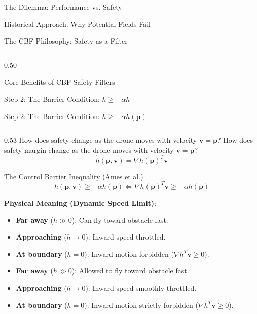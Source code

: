 \documentclass[aspectratio=169,10pt]{beamer}
\begin{document}
\begin{frame}{The Dilemma: Performance vs. Safety}
\begin{frame}{Historical Approach: Why Potential Fields Fail}
\begin{frame}{The CBF Philosophy: Safety as a Filter}
\begin{column}{0.50\textwidth}
\begin{exampleblock}{Core Benefits of CBF Safety Filters}
\begin{frame}{Step 2: The Barrier Condition: $\dot{h} \ge -\alpha h$}
\begin{frame}{Step 2: The Barrier Condition: $\dot{h} \ge -\alpha h(\mathbf{p})$}
  \begin{columns}[T]
    \begin{column}{0.53\textwidth}
      How does safety change as the drone moves with velocity $\mathbf{v} = \mathbf{\dot{p}}$?
      How does safety margin change as the drone moves with velocity $\mathbf{v} = \mathbf{\dot{p}}$?
      $$\dot{h}(\mathbf{p}, \mathbf{v}) = \nabla h(\mathbf{p})^T \mathbf{v}$$

      \begin{block}{The Control Barrier Inequality (Ames et al.)}
        $$\dot{h}(\mathbf{p}, \mathbf{v}) \ge -\alpha h(\mathbf{p}) \iff \nabla h(\mathbf{p})^T \mathbf{v} \ge -\alpha h(\mathbf{p})$$
      \end{block}

      \small
      \textbf{Physical Meaning (Dynamic Speed Limit)}:
      \begin{itemize}
        \item \textbf{Far away} ($h \gg 0$): Can fly toward obstacle fast.
        \item \textbf{Approaching} ($h \to 0$): Inward speed throttled.
        \item \textbf{At boundary} ($h = 0$): Inward motion forbidden ($\nabla h^T \mathbf{v} \ge 0$).
        \item \textbf{Far away} ($h \gg 0$): Allowed to fly toward obstacle fast.
        \item \textbf{Approaching} ($h \to 0$): Inward speed smoothly throttled.
        \item \textbf{At boundary} ($h = 0$): Inward motion strictly forbidden ($\nabla h^T \mathbf{v} \ge 0$).
      \end{itemize}
    \end{column}


\end{columns}
\end{frame}
\end{frame}
\end{exampleblock}
\end{column}
\end{frame}
\end{frame}
\end{frame}
\end{document}

